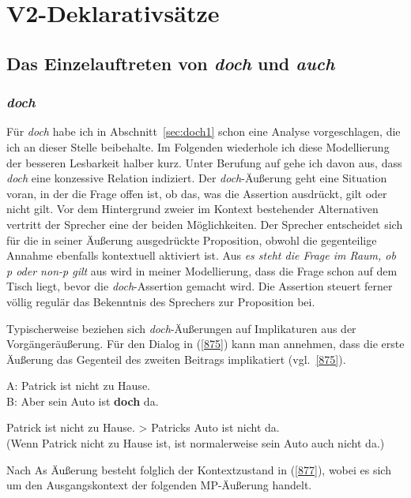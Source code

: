 {\section{V2-Deklarativsätze}
\label{sec:V2}
\subsection{Das Einzelauftreten von \textit{doch} und \textit{auch}}
\subsubsection{\textit{doch}}
\label{sec:doch}
Für \textit{doch} habe ich in Abschnitt~\ref{sec:doch1} schon eine Analyse vorgeschlagen, die ich an dieser Stelle beibehalte. Im Folgenden wiederhole ich diese Modellierung der besseren Lesbarkeit halber kurz. Unter Berufung auf \citet{Diewald1998} gehe ich davon aus, dass \textit{doch} eine konzessive Relation indiziert. Der \textit{doch}-Äu\-ße\-rung geht eine Situation voran, in der die Frage offen ist, ob das, was die Assertion ausdrückt, gilt oder nicht gilt. Vor dem Hintergrund zweier im Kontext bestehender Alternativen vertritt der Sprecher eine der beiden Möglichkeiten. Der Sprecher entscheidet sich für die in seiner Äußerung ausgedrückte Proposition, obwohl die gegenteilige Annahme ebenfalls kontextuell aktiviert ist. Aus \textit{es steht die Frage im Raum, ob p oder non-p gilt}  aus \citet{Diewald1998} wird in meiner Modellierung, dass die Frage schon auf dem Tisch liegt, bevor die \textit{doch}-Assertion gemacht wird. Die Assertion steuert ferner völlig regulär das Bekenntnis des Sprechers zur Proposition bei.

Typischerweise beziehen sich \textit{doch}-Äußerungen auf Implikaturen  aus der Vor\-gängeräußerung. Für den Dialog in (\ref{875}) kann man annehmen, dass die erste Äußerung das Gegenteil des zweiten Beitrags implikatiert (vgl.\ \ref{875}).

\begin{exe}
	\ex\label{875}
	A: Patrick ist nicht zu Hause.\\
	B: Aber sein Auto ist \textbf{doch} da.
	\hfill\hbox{\citet[83]{Ormelius-Sandblom1997}}
\end{exe}
	
\begin{exe}
	\ex\label{876}
	Patrick ist nicht zu Hause. > Patricks Auto ist nicht da.\\
	(Wenn Patrick nicht zu Hause ist, ist normalerweise sein Auto auch nicht da.)
	\hfill\hbox{\citet[83]{Ormelius-Sandblom1997}}
\end{exe}
Nach As Äußerung besteht folglich der Kontextzustand in (\ref{877}), wobei es sich um den Ausgangskontext der folgenden MP-Äußerung handelt.

}
